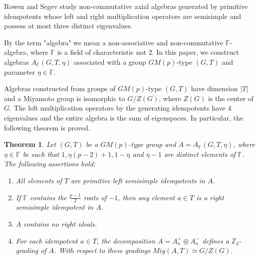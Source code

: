 \documentclass[12pt]{article}
\newcommand\F{\mathbb{F}}
\newcommand\Z{\mathbb{Z}}
\newtheorem{Th}{Theorem}
\begin{document}
	Rowen and Segev \cite{RS} study non-commutative axial algebras generated by primitive idempotents whose left and right multiplication operators are semisimple and possess at most three distinct eigenvalues.
	
	

By the term "algebra" we mean a non-associative and non-commutative $\F$-algebra, where $\F$ is a field of characteristic not $2$. In this paper, we construct algebras $A_{\F}(G, T, \eta)$ associated with a group $GM(p)$-type $(G,T)$ and parameter $\eta\in \F$.

Algebras constructed from groups of $GM(p)$-type $(G,T)$ have dimension $|T|$ and a Miyamoto group is isomorphic to $G/Z(G)$, where $Z(G)$ is the center of $G$. The left multiplication operators by the generating idempotents have $4$ eigenvalues and the entire algebra is the sum of eigenspaces. In particular, the following theorem is proved.

\begin{Th}
Let $(G,T)$ be a $GM(p)$-type group and $A=A_{\F}(G,T,\eta)$, where $\eta\in \F$ be such that $1,\eta(p-2)+1, 1-\eta$ and $\eta-1$ are distinct elements of $\F$. The following assertions hold:
\begin{enumerate}
	\item All elements of $T$ are primitive left semisimple idempotents in $A$.

    \item If $\F$ contains the $\frac{p-1}{2}$ roots of $-1$, then any element $a\in T$ is a right semisimple idempotent in $A$.
	
    \item $A$ contains no right ideals.
	
	\item For each idempotent $a\in T$, the decomposition $A=A^+_a\oplus A^-_a$ defines a $\Z_2$-grading of $A$.	
	With respect to these gradings $Miy(A,T)\simeq G/Z(G)$.
\end{enumerate}
\end{Th}
\end{document}
